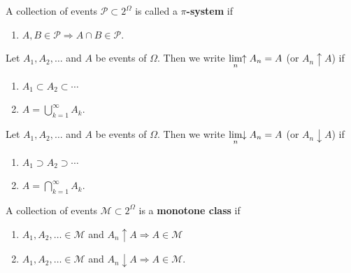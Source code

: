 \begin{definition}[{\bf $\pi$-system}]
A  collection of events $\mathcal P\subset 2^\Omega$ is called a {\bf $\pi$-system} if
\begin{enumerate}
\item $A, B\in\mathcal P \Longrightarrow A\cap B\in\mathcal P$.
\end{enumerate}
\end{definition}




\begin{definition}[{\bf $A_n\uparrow A$}]
Let $A_1, A_2, \ldots$  and $A$ be events of $\Omega$. Then we write $\displaystyle\lim_{n}\!\!\uparrow A_n = A$ (or $A_n\uparrow A$) if
\begin{enumerate}
\item $A_1\subset A_2 \subset \cdots$
\item $A=\bigcup_{k=1}^\infty A_k$.
\end{enumerate}
\end{definition}

\begin{definition}[{\bf $A_n\downarrow A$}]
Let $A_1, A_2, \ldots$  and $A$ be events of $\Omega$. Then we write $\displaystyle\lim_{n}\!\!\downarrow A_n = A$ (or $A_n\downarrow A$) if
\begin{enumerate}
\item $A_1\supset A_2 \supset \cdots$
\item $A=\bigcap_{k=1}^\infty A_k$.
\end{enumerate}
\end{definition}



\begin{definition}
A collection of events $\mathcal M\subset 2^\Omega$  is a {\bf monotone class} if
\begin{enumerate}
\item $A_1, A_2,\ldots\in\mathcal M$ and $A_n\uparrow A \Longrightarrow A\in\mathcal M$
\item $A_1, A_2,\ldots\in\mathcal M$ and $A_n\downarrow A \Longrightarrow A\in\mathcal M$.
\end{enumerate}
\end{definition}




